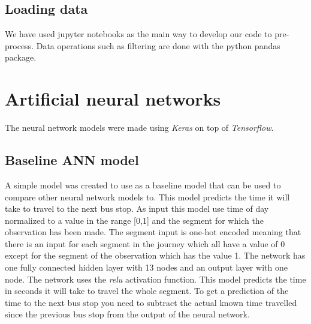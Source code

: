 \subsection{Loading data}
We have used jupyter notebooks as the main way to develop our code to pre-process. Data operations such as filtering are done with the python pandas package.


\section{Artificial neural networks}
The neural network models were made using \textit{Keras} on top of \textit{Tensorflow}.

\subsection{Baseline ANN model}
A simple model was created to use as a baseline model that can be used to compare other neural network models to. This model predicts the time it will take to travel to the next bus stop. As input this model use time of day normalized to a value in the range [0,1] and the segment for which the observation has been made. The segment input is one-hot encoded meaning that there is an input for each segment in the journey which all have a value of 0 except for the segment of the observation which has the value 1. The network has one fully connected hidden layer with 13 nodes and an output layer with one node. The network uses the \textit{relu} activation function.
This model predicts the time in seconds it will take to travel the whole segment. To get a prediction of the time to the next bus stop you need to subtract the actual known time travelled since the previous bus stop from the output of the neural network.

